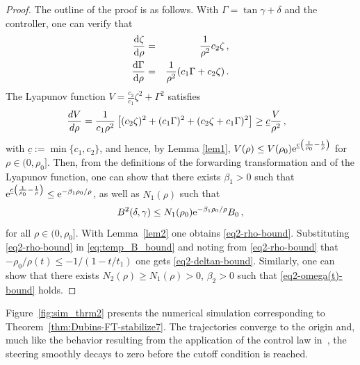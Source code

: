 \documentclass[letterpaper, 10 pt, conference]{ieeeconf}  %
\begin{document}
\begin{proof}
The outline of the proof is as follows. With $\Gamma=\tan\gamma +\delta$ and the controller, one can verify that
\begin{eqnarray}
\frac{{\rm d}\zeta}{{\rm d}\rho }&=& \frac{1}{\rho^2}c_2 \zeta \,,
\\
\frac{{\rm d}\Gamma}{{\rm d}\rho} &=& \frac{1}{\rho^2}(c_1\Gamma + c_2\zeta)\,.
\end{eqnarray}
The Lyapunov function $V=\frac{c_2}{c_1}\zeta^2+\Gamma^2$ satisfies 
\begin{equation}
\hspace*{-0.3cm}
\frac{dV}{d\rho} = \frac{1}{c_1\rho^2}\left[
(c_2\zeta)^2 +(c_1\Gamma)^2 + (c_2\zeta+c_1\Gamma)^2
\right]\geq \underline c \frac{ V}{\rho^2}\,,
\end{equation} 
with $\underline c :=\min\{c_1,c_2\}$, and hence, by Lemma \ref{lem1}, $V(\rho) \leq {V(\rho_0)}{{\rm e}^{\underline c \left(\frac{1}{\rho_0}-\frac{1}{\rho}\right)}}$ for $\rho\in(0,\rho_0]$. 
Then, from the definitions of the forwarding transformation and of the Lyapunov function,
one can show that there exists $\beta_1 > 0$ such that ${\rm e}^{\underline c \left(\frac{1}{\rho_0}-\frac{1}{\rho}\right)} \le {\rm e}^{- \beta_1 \rho_0 / \rho}$, as well as $N_1(\rho)$ such that 
\begin{equation}
    B^2(\delta,\gamma) \leq N_1(\rho_0) {\rm e}^{- \beta_1 \rho_0 / \rho} B_0 \,,\label{eq:temp_B_bound}
\end{equation}
 for all $\rho \in (0, \rho_0]$.
With Lemma~\ref{lem2} one obtains \eqref{eq2-rho-bound}. Substituting \eqref{eq2-rho-bound} in \eqref{eq:temp_B_bound} and noting from \eqref{eq2-rho-bound} that $-\rho_0/\rho(t) \le -1 / (1-t/t_1)$ one gets \eqref{eq2-deltan-bound}.
Similarly, one can show that there exists $N_2(\rho) \ge N_1(\rho) > 0$, $\beta_2 > 0$ such that \eqref{eq2-omega(t)-bound} holds.
\end{proof}

Figure~\ref{fig:sim_thrm2} presents the numerical simulation corresponding to Theorem~\ref{thm:Dubins-FT-stabilize7}. The trajectories converge to the origin and, much like the behavior resulting from the application of the control law in~\cite[Thm.~2]{Krstic2025_Dubins}, the steering smoothly decays to zero before the cutoff condition is reached.
\end{document}
